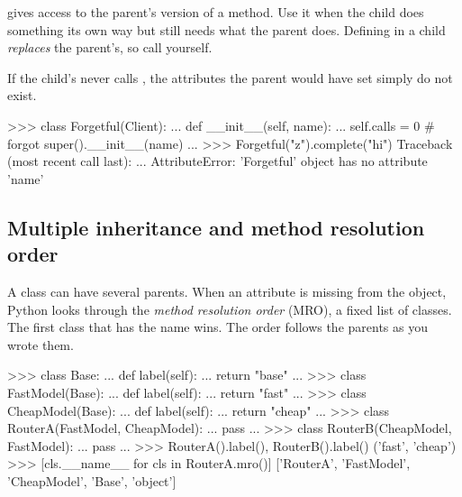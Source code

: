  gives access to the parent's version of a method. Use it when the child does
something its own way but still needs what the parent does. Defining  in a child
\emph{replaces} the parent's, so call  yourself.

\begin{trap}
If the child's  never calls , the attributes the parent
would have set simply do not exist.
\end{trap}

\begin{pycode}
>>> class Forgetful(Client):
...     def __init__(self, name):
...         self.calls = 0                  # forgot super().__init__(name)
...
>>> Forgetful("z").complete("hi")
Traceback (most recent call last):
  ...
AttributeError: 'Forgetful' object has no attribute 'name'
\end{pycode}

\subsection{Multiple inheritance and method resolution order}

A class can have several parents. When an attribute is missing from the object, Python looks
through the \emph{method resolution order} (MRO), a fixed list of classes. The first class that
has the name wins. The order follows the parents as you wrote them.

\begin{center}
\end{center}

\begin{pycode}
>>> class Base:
...     def label(self):
...         return "base"
...
>>> class FastModel(Base):
...     def label(self):
...         return "fast"
...
>>> class CheapModel(Base):
...     def label(self):
...         return "cheap"
...
>>> class RouterA(FastModel, CheapModel):
...     pass
...
>>> class RouterB(CheapModel, FastModel):
...     pass
...
>>> RouterA().label(), RouterB().label()
('fast', 'cheap')
>>> [cls.__name__ for cls in RouterA.mro()]
['RouterA', 'FastModel', 'CheapModel', 'Base', 'object']
\end{pycode}

